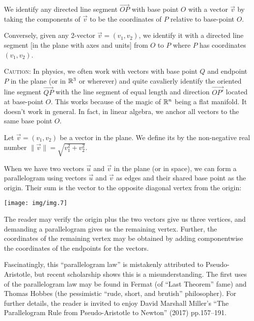 We identify any directed line segment $\overrightarrow{OP}$ with base
point $O$ with a vector $\vec{v}$ by taking the components of $\vec{v}$
to be the coordinates of $P$ relative to base-point $O$.

Conversely, given any 2-vector $\vec{v}=(v_{1},v_{2})$, we identify it
with a directed line segment [in the plane with axes and units] from $O$
to $P$ where $P$ has coordinates $(v_{1},v_{2})$.

\begin{ddanger}\textsc{Caution:}
In physics, we often work with vectors with base point $Q$ and endpoint
$P$ in the plane (or in $\mathbb{R}^{3}$ or wherever) and quite cavalierly
identify the oriented line segment $\overrightarrow{QP}$ with the line
segment of equal length and direction $\overrightarrow{OP'}$ located at
base-point $O$. This works because of the magic of $\mathbb{R}^{n}$ being a
flat manifold. It doesn't work in general. In fact, in linear algebra,
we anchor all vectors to the same base point $O$.
\end{ddanger}

\begin{definition}
Let $\vec{v}=(v_{1},v_{2})$ be a vector in the plane. We define its
 by the non-negative real number
$\|\vec{v}\| = \sqrt{v_{1}^{2}+v_{2}^{2}}$.
\end{definition}

When we have two vectors $\vec{u}$ and $\vec{v}$ in the plane (or in space), we can form a
parallelogram using vectors $\vec{u}$ and $\vec{v}$ as edges and their
shared base point as the origin. Their sum
is the vector to the opposite diagonal vertex from the origin:
\begin{center}
  \texttt{[image: img/img.7]}
\end{center}
The reader may verify the origin plus the two vectors give us three
vertices, and demanding a parallelogram gives us the remaining
vertex. Further, the coordinates of the remaining vertex may be obtained
by adding componentwise the coordinates of the endpoints for the vectors.

\begin{remark}
Fascinatingly, this ``parallelogram law'' is mistakenly attributed to
Pseudo-Aristotle, but recent scholarship shows this is a
misunderstanding. The first uses of the parallelogram law may be found
in Fermat (of ``Last Theorem'' fame) and Thomas Hobbes (the pessimistic ``rude,
short, and brutish'' philosopher). For further details, the reader is
invited to enjoy David Marshall Miller's
``The Parallelogram Rule from Pseudo-Aristotle to Newton''
  (2017) pp.157--191.
\end{remark}

